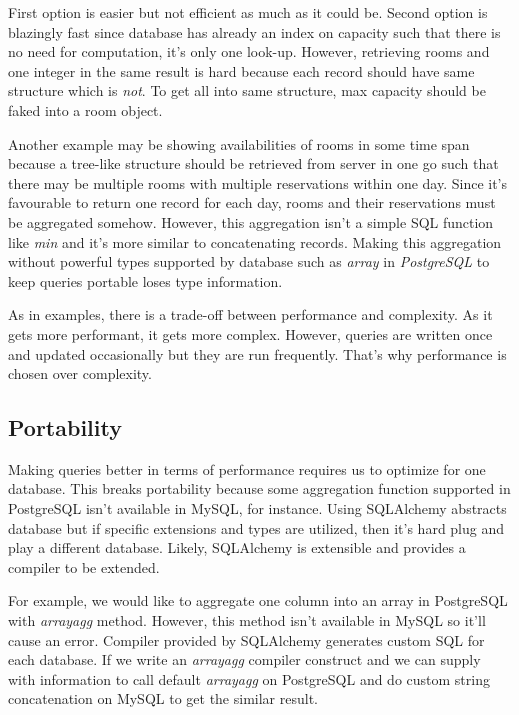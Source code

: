 First option is easier but not efficient as much as it could be. Second option is blazingly fast since database has already an index on capacity such that there is no need for computation, it's only one look-up. However, retrieving rooms and one integer in the same result is hard because each record should have same structure which is \textit{not}. To get all into same structure, max capacity should be faked into a room object. 

Another example may be showing availabilities of rooms in some time span because a tree-like structure should be retrieved from server in one go such that there may be multiple rooms with multiple reservations within one day. Since it's favourable to return one record for each day, rooms and their reservations must be aggregated somehow. However, this aggregation isn't a simple SQL function like \textit{min} and it's more similar to concatenating records. Making this aggregation without powerful types supported by database such as \textit{array} in \textit{PostgreSQL} to keep queries portable loses type information.

As in examples, there is a trade-off between performance and complexity. As it gets more performant, it gets more complex. However, queries are written once and updated occasionally but they are run frequently. That's why performance is chosen over complexity.

\subsection{Portability}

Making queries better in terms of performance requires us to optimize for one database. This breaks portability because some aggregation function supported in PostgreSQL isn't available in MySQL, for instance. Using SQLAlchemy abstracts database but if specific extensions and types are utilized, then it's hard plug and play a different database. Likely, SQLAlchemy is extensible and provides a compiler to be extended.

For example, we would like to aggregate one column into an array in PostgreSQL with \textit{array\textunderscore agg} method. However, this method isn't available in MySQL so it'll cause an error. Compiler provided by SQLAlchemy generates custom SQL for each database. If we write an \textit{array\textunderscore agg} compiler construct and we can supply with information to call default \textit{array\textunderscore agg} on PostgreSQL and do custom string concatenation on MySQL to get the similar result.


